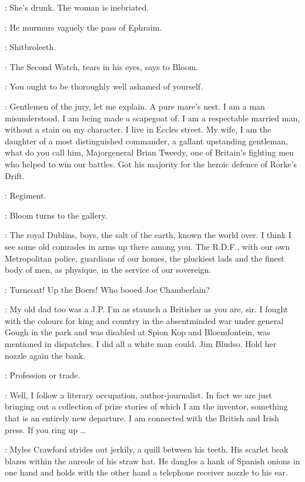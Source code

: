 \Bloom:
She's drunk.
The woman is inebriated.

:
He murmurs vaguely the pass of Ephraim.

\Bloom:
Shitbroleeth.

:
The Second Watch,
tears in his eyes,
says to Bloom.

\SecondWatch:
You ought to be thoroughly well ashamed of yourself.

\Bloom:
Gentlemen of the jury,
let me explain.
A pure mare's nest.
I am a man misunderstood.
I am being made a scapegoat of.
I am a respectable married man,
without a stain on my character.
I live in Eccles street.
My wife,
I am the daughter of a most distinguished commander,
a gallant upstanding gentleman,
what do you call him,
Majorgeneral Brian Tweedy,
one of Britain's fighting men who helped to win our battles.
Got his majority for the heroic defence of Rorke's Drift.

\FirstWatch:
Regiment.

:
Bloom turns to the gallery.

\Bloom:
The royal Dublins,
boys,
the salt of the earth,
known the world over.
I think I see some old comrades in arms up there among you.
The R.D.F.,
with our own Metropolitan police,
guardians of our homes,
the pluckiest lads and the finest body of men,
as physique,
in the service of our sovereign.

\Voice:
Turncoat!
Up the Boers!
Who booed Joe Chamberlain?

\Bloom:
My old dad too was a J.P.
I'm as staunch a Britisher as you are,
sir.
I fought with the colours for king and country
in the absentminded war under general Gough in the park
and was disabled at Spion Kop and Bloemfontein,
was mentioned in dispatches.
I did all a white man could.
Jim Bludso.
Hold her nozzle again the bank.

\FirstWatch:
Profession or trade.

\Bloom:
Well,
I follow a literary occupation,
author-journalist.
In fact we are just bringing out a collection of prize stories
of which I am the inventor,
something that is an entirely new departure.
I am connected with the British and Irish press.
If you ring up \ldots

:
Myles Crawford strides out jerkily,
a quill between his teeth.
His scarlet beak blazes within the aureole of his straw hat.
He dangles a hank of Spanish onions in one hand and holds with the other hand
a telephone receiver nozzle to his ear.

